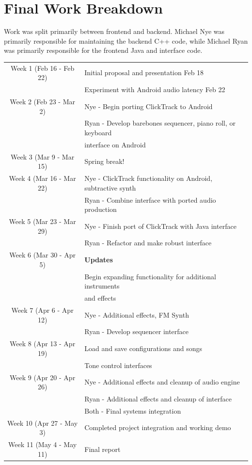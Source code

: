 \documentclass[letterpaper,12pt]{article}
\begin{document}
\clearpage
\section{Final Work Breakdown}

Work was split primarily between frontend and backend. Michael Nye was primarily responsible for maintaining the backend C++ code, while Michael Ryan was primarily responsible for the frontend Java and interface code. \\

\onehalfspacing
\centering
\begin{tabular}{ c | l }  

  Week 1 (Feb 16 - Feb 22) & Initial proposal and presentation Feb 18 \\ 
                           & Experiment with Android audio latency Feb 22 \\ \hline
  Week 2 (Feb 23 - Mar 2)  & Nye - Begin porting ClickTrack to Android \\
                           & Ryan - Develop barebones sequencer, piano roll, or keyboard \\ &interface on Android \\ \hline
  Week 3 (Mar 9 - Mar 15)  & Spring break!  \\ \hline
  Week 4 (Mar 16 - Mar 22) & Nye - ClickTrack functionality on Android, subtractive synth \\ 
                           & Ryan - Combine interface with ported audio production \\ \hline
  Week 5 (Mar 23 - Mar 29) & Nye - Finish port of ClickTrack with Java interface \\
                           & Ryan - Refactor and make robust interface \\ \hline
  Week 6 (Mar 30 - Apr 5)  & \textbf{Updates} \\
                           & Begin expanding functionality for additional instruments \\ & and effects\\ \hline
  Week 7 (Apr 6 - Apr 12)  & Nye - Additional effects, FM Synth \\
                           & Ryan - Develop sequencer interface \\ \hline
  Week 8 (Apr 13 - Apr 19) & Load and save configurations and songs \\
                           & Tone control interfaces \\ \hline
  Week 9 (Apr 20 - Apr 26) & Nye - Additional effects and cleanup of audio engine \\
                           & Ryan - Additional effects and cleanup of interface \\ 
                           & Both - Final systems integration \\ \hline
  Week 10 (Apr 27 - May 3) & Completed project integration and working demo  \\ \hline
  Week 11 (May 4 - May 11) & Final report  \\ 
\end{tabular}
  
\end{document}
